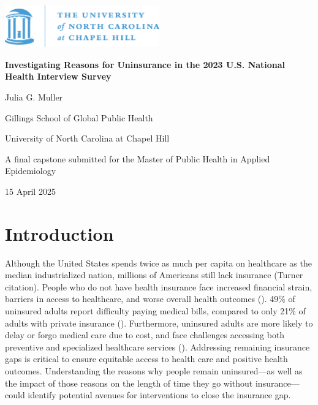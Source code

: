 \documentclass[12pt]{article}
\newcommand{\documentgeometry}{\newgeometry{top=1in, bottom=1in, left=1in, right=1in}}
\begin{document}
\begin{titlepage}
    \centering
    \vspace*{-3cm}
    \includegraphics[width=0.5\textwidth]{reports/unc-logo.png}\par
    \vspace{0.5cm}
    {\Huge\bfseries Investigating Reasons for Uninsurance in the 2023 U.S. National Health Interview Survey \par}
    \vspace{2cm}
    {\LARGE Julia G. Muller\par}
    {\Large Gillings School of Global Public Health \par}
    {\Large University of North Carolina at Chapel Hill \par}
    \vspace{3cm}
    {\large A final capstone submitted for the Master of Public Health in Applied Epidemiology \par}
    \vspace{1cm}
    {\large 15 April 2025\par}
    \vspace{1cm}
\end{titlepage}


\newpage
\documentgeometry
\tableofcontents


\newpage
\section{Introduction}

  Although the United States spends twice as much per capita on healthcare as the median industrialized nation, millions of Americans still lack insurance (Turner citation). People who do not have health insurance face increased financial strain, barriers in access to healthcare, and worse overall health outcomes (\cite{davis_uninsured_2007}). 49\% of uninsured adults report difficulty paying medical bills, compared to only 21\% of adults with private insurance (\cite{tolbert_key_2024}). Furthermore, uninsured adults are more likely to delay or forgo medical care due to cost, and face challenges accessing both preventive and specialized healthcare services (\cite{cha_reasons_2020, erly_characterization_2022}). Addressing remaining insurance gaps is critical to ensure equitable access to health care and positive health outcomes. Understanding the reasons why people remain uninsured—as well as the impact of those reasons on the length of time they go without insurance—could identify potential avenues for interventions to close the insurance gap.
\end{document}

